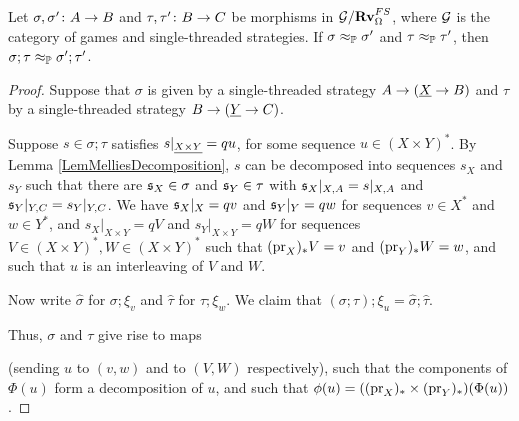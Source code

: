 \documentclass{report}[11pt]
\begin{document}
\begin{proposition}
  Let $\sigma,\sigma'\colon A \to B$ and $\tau,\tau'\colon B \to C$ be morphisms in $\mathcal G/{\normalfont\textbf{Rv}}_{\Omega}^{FS}$, where $\mathcal G$ is the category of games and single-threaded strategies.
  If $\sigma\approx_{\mathbb{P}}\sigma'$ and $\tau\approx_{\mathbb{P}}\tau'$, then $\sigma;\tau\approx_{\mathbb{P}}\sigma';\tau'$.
\end{proposition}
\begin{proof}
  Suppose that $\sigma$ is given by a single-threaded strategy $A \to ({\underline{X}} \to B)$ and $\tau$ by a single-threaded strategy $B \to ({\underline{Y}} \to C)$.
  
  Suppose $s\in\sigma;\tau$ satisfies $s\vert_{{\underline{X\times Y}}}=qu$, for some sequence $u\in(X\times Y)^*$.
  By Lemma \ref{LemMelliesDecomposition}, $s$ can be decomposed into sequences $s_X$ and $s_Y$ such that there are $\mathfrak s_X\in\sigma$ and $\mathfrak s_Y\in\tau$ with $\mathfrak s_X\vert_{X,A}=s\vert_{X,A}$ and $\mathfrak s_Y\vert_{Y,C}=s_Y\vert_{Y,C}$.
  We have $\mathfrak s_X\vert_X=qv$ and $\mathfrak s_Y\vert_Y=qw$ for sequences $v\in X^*$ and $w\in Y^*$, and $s_X\vert_{X\times Y} = qV$ and $s_Y\vert_{X\times Y}=qW$ for sequences $V\in (X\times Y)^*,W\in (X\times Y)^*$ such that $(\operatorname{pr}_X)_*V = v$ and $(\operatorname{pr}_Y)_*W = w$, and such that $u$ is an interleaving of $V$ and $W$.

  Now write $\hat\sigma$ for $\sigma;\xi_v$ and $\hat\tau$ for $\tau;\xi_w$.
  We claim that $(\sigma;\tau);\xi_u = \hat{\sigma};\hat{\tau}$.

  Thus, $\sigma$ and $\tau$ give rise to maps
  (sending $u$ to $(v,w)$ and to $(V,W)$ respectively), such that the components of $\Phi(u)$ form a decomposition of $u$, and such that $\phi(u) = ((\operatorname{pr}_X)_*\times(\operatorname{pr}_Y)_*)(\Phi(u))$.
\end{proof}



\end{document}
